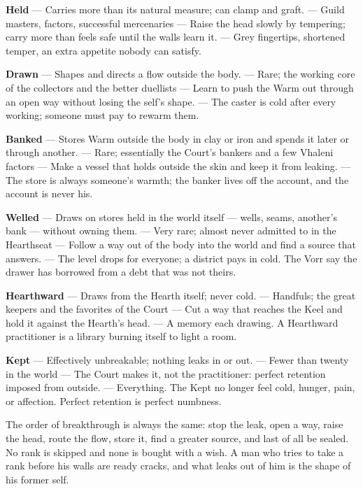 \documentclass{design/chronicle}
\begin{document}
\textbf{Held} — Carries more than its natural measure; can clamp and graft. — Guild masters, factors, successful mercenaries — Raise the head slowly by tempering; carry more than feels safe until the walls learn it. — Grey fingertips, shortened temper, an extra appetite nobody can satisfy.\par

\textbf{Drawn} — Shapes and directs a flow outside the body. — Rare; the working core of the collectors and the better duellists — Learn to push the Warm out through an open way without losing the self’s shape. — The caster is cold after every working; someone must pay to rewarm them.\par

\textbf{Banked} — Stores Warm outside the body in clay or iron and spends it later or through another. — Rare; essentially the Court’s bankers and a few Vhaleni factors — Make a vessel that holds outside the skin and keep it from leaking. — The store is always someone’s warmth; the banker lives off the account, and the account is never his.\par

\textbf{Welled} — Draws on stores held in the world itself — wells, seams, another’s bank — without owning them. — Very rare; almost never admitted to in the Hearthseat — Follow a way out of the body into the world and find a source that answers. — The level drops for everyone; a district pays in cold. The Vorr say the drawer has borrowed from a debt that was not theirs.\par

\textbf{Hearthward} — Draws from the Hearth itself; never cold. — Handfuls; the great keepers and the favorites of the Court — Cut a way that reaches the Keel and hold it against the Hearth’s head. — A memory each drawing. A Hearthward practitioner is a library burning itself to light a room.\par

\textbf{Kept} — Effectively unbreakable; nothing leaks in or out. — Fewer than twenty in the world — The Court makes it, not the practitioner: perfect retention imposed from outside. — Everything. The Kept no longer feel cold, hunger, pain, or affection. Perfect retention is perfect numbness.\par

The order of breakthrough is always the same: stop the leak, open a way, raise the head, route the flow, store it, find a greater source, and last of all be sealed. No rank is skipped and none is bought with a wish. A man who tries to take a rank before his walls are ready cracks, and what leaks out of him is the shape of his former self.
\end{document}
